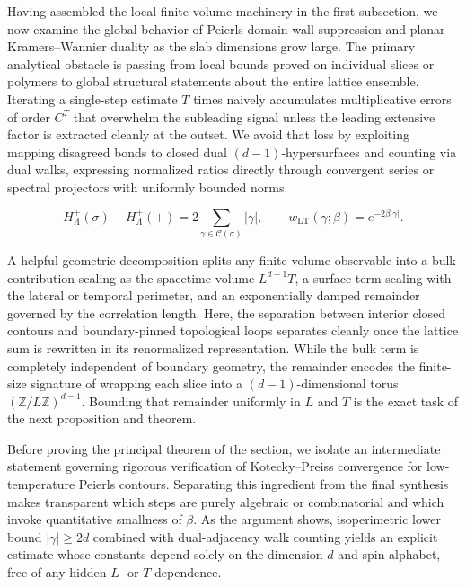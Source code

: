 \documentclass[11pt]{article}
\theoremstyle{definition}
\begin{document}
Having assembled the local finite-volume machinery in the first subsection, we now
examine the global behavior of Peierls domain-wall suppression and planar
Kramers--Wannier duality as the slab dimensions grow large. The primary analytical
obstacle is passing from local bounds proved on individual slices or polymers to
global structural statements about the entire lattice ensemble. Iterating a
single-step estimate $T$ times naively accumulates multiplicative errors of order
$C^T$ that overwhelm the subleading signal unless the leading extensive factor is
extracted cleanly at the outset. We avoid that loss by exploiting mapping disagreed
bonds to closed dual $(d-1)$-hypersurfaces and counting via dual walks, expressing
normalized ratios directly through convergent series or spectral projectors with
uniformly bounded norms.

\[
  H_\Lambda^+(\sigma) - H_\Lambda^+(+) = 2 \sum_{\gamma \in \mathcal{C}(\sigma)} |\gamma|, \qquad w_{\mathrm{LT}}(\gamma; \beta) = e^{-2\beta |\gamma|}.
\]

A helpful geometric decomposition splits any finite-volume observable into a bulk
contribution scaling as the spacetime volume $L^{d-1} T$, a surface term scaling
with the lateral or temporal perimeter, and an exponentially damped remainder
governed by the correlation length. Here, the separation between interior closed
contours and boundary-pinned topological loops separates cleanly once the lattice
sum is rewritten in its renormalized representation. While the bulk term is
completely independent of boundary geometry, the remainder encodes the finite-size
signature of wrapping each slice into a $(d-1)$-dimensional torus
$(\mathbb{Z}/L\mathbb{Z})^{d-1}$. Bounding that remainder uniformly in $L$ and $T$
is the exact task of the next proposition and theorem.

Before proving the principal theorem of the section, we isolate an intermediate
statement governing rigorous verification of Kotecky--Preiss convergence for
low-temperature Peierls contours. Separating this ingredient from the final
synthesis makes transparent which steps are purely algebraic or combinatorial and
which invoke quantitative smallness of $\beta$. As the argument shows, isoperimetric
lower bound $|\gamma| \ge 2d$ combined with dual-adjacency walk counting yields an
explicit estimate whose constants depend solely on the dimension $d$ and spin
alphabet, free of any hidden $L$- or $T$-dependence.
\end{document}
